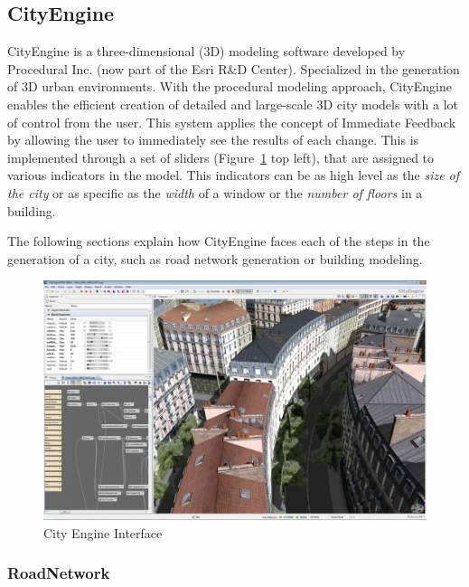 
\subsection{CityEngine \cite{Parish2001} \cite{Muller2006}}
\label{sub:cityengine}

CityEngine is a three-dimensional (3D) modeling software developed by Procedural Inc. (now part of the Esri R\&D Center). Specialized in the generation of 3D urban environments. With the procedural modeling approach, CityEngine enables the efficient creation of detailed and large-scale 3D city models with a lot of control from the user. This system applies the concept of Immediate Feedback by allowing the user to immediately see the results of each change. This is implemented through a set of sliders (Figure~\ref{fig:CEinterface} top left), that are assigned to various indicators in the model. This indicators can be as high level as the \emph{size of the city} or as specific as the \emph{width} of a window or the \emph{number of floors} in a building.

The following sections explain how CityEngine faces each of the steps in the generation of a city, such as road network generation or building modeling.

\begin{figure}[htbp]
  \centering
  \includegraphics[width=\textwidth]{img/Procedural-Modeling-of-Cities/interface.jpg}
  \caption{City Engine Interface}
  \label{fig:CEinterface}
\end{figure}

\subsubsection{RoadNetwork} %
\label{ssub:roadnetwork1}


